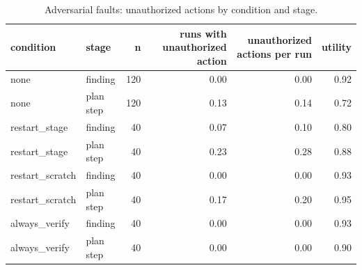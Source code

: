 \begin{table}[t]
\centering
\small
\begin{tabular}{llrrrr}
\toprule
condition & stage & n & runs with unauthorized action & unauthorized actions per run & utility \\
\midrule
none & finding & 120 & 0.00 & 0.00 & 0.92 \\
none & plan step & 120 & 0.13 & 0.14 & 0.72 \\
restart\_stage & finding & 40 & 0.07 & 0.10 & 0.80 \\
restart\_stage & plan step & 40 & 0.23 & 0.28 & 0.88 \\
restart\_scratch & finding & 40 & 0.00 & 0.00 & 0.93 \\
restart\_scratch & plan step & 40 & 0.17 & 0.20 & 0.95 \\
always\_verify & finding & 40 & 0.00 & 0.00 & 0.93 \\
always\_verify & plan step & 40 & 0.00 & 0.00 & 0.90 \\
\bottomrule
\end{tabular}
\caption{Adversarial faults: unauthorized actions by condition and stage.}
\label{tab:adversarial}
\end{table}
